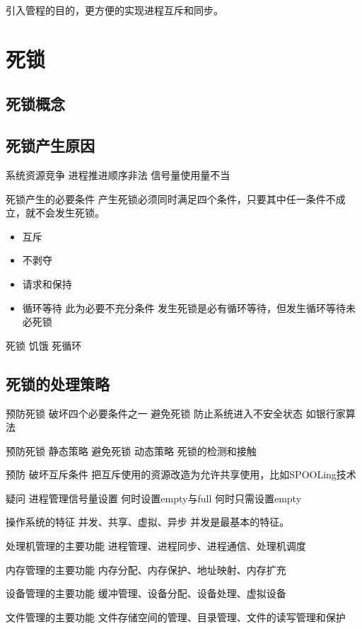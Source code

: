 引入管程的目的，更方便的实现进程互斥和同步。


\section{死锁}

\subsection{死锁概念}
\subsection{死锁产生原因}
系统资源竞争
进程推进顺序非法
信号量使用量不当

死锁产生的必要条件
产生死锁必须同时满足四个条件，只要其中任一条件不成立，就不会发生死锁。

\begin{itemize}
	\item 互斥
	\item 不剥夺
	\item 请求和保持
	\item 循环等待 此为必要不充分条件
			发生死锁是必有循环等待，但发生循环等待未必死锁
\end{itemize}

死锁 
饥饿
死循环

\subsection{死锁的处理策略}

预防死锁 破坏四个必要条件之一
避免死锁 防止系统进入不安全状态 如银行家算法

预防死锁 静态策略
避免死锁 动态策略
死锁的检测和接触

预防
破坏互斥条件
把互斥使用的资源改造为允许共享使用，比如SPOOLing技术



疑问 
进程管理信号量设置
何时设置empty与full
何时只需设置empty



操作系统的特征
并发、共享、虚拟、异步
并发是最基本的特征。

处理机管理的主要功能
进程管理、进程同步、进程通信、处理机调度

内存管理的主要功能
内存分配、内存保护、地址映射、内存扩充

设备管理的主要功能
缓冲管理、设备分配、设备处理、虚拟设备

文件管理的主要功能
文件存储空间的管理、目录管理、文件的读写管理和保护

